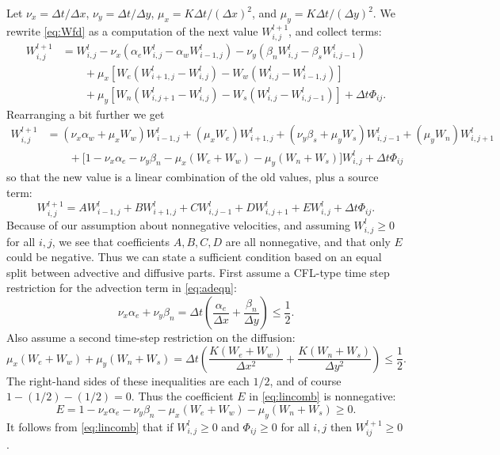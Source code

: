 \documentclass[11pt,final]{amsart}%
\newcommand{\Wlij}{W^l_{i,j}}
\begin{document}
Let $\nu_x = \Delta t/\Delta x$, $\nu_y = \Delta t/\Delta y$, $\mu_x = K \Delta t / (\Delta x)^2$, and $\mu_y = K \Delta t / (\Delta y)^2$.  We rewrite \eqref{eq:Wfd} as a computation of the next value $W_{i,j}^{l+1}$, and collect terms:
\begin{align*}
 W_{i,j}^{l+1} &= \Wlij - \nu_x \left(\alpha_e \Wlij - \alpha_w W_{i-1,j}^l\right) - \nu_y \left(\beta_n \Wlij - \beta_s W_{i,j-1}^l\right)  \\
      &\qquad + \mu_x \left[W_e \left(W_{i+1,j}^l - \Wlij\right) - W_w \left(\Wlij - W_{i-1,j}^l\right)\right]  \\
      &\qquad + \mu_y \left[W_n \left(W_{i,j+1}^l - \Wlij\right) - W_s \left(\Wlij - W_{i,j-1}^l\right)\right] + \Delta t \Phi_{ij}.
\end{align*}
Rearranging a bit further we get
\begin{align*}
 W_{i,j}^{l+1} &= (\nu_x \alpha_w + \mu_x W_w) W_{i-1,j}^l + (\mu_x W_e) W_{i+1,j}^l + (\nu_y \beta_s + \mu_y W_s) W_{i,j-1}^l + (\mu_y W_n) W_{i,j+1}^l \\
      &\qquad + \Big[1 - \nu_x \alpha_e - \nu_y \beta_n - \mu_x (W_e + W_w) - \mu_y (W_n + W_s)\Big] \Wlij + \Delta t \Phi_{ij}
\end{align*}
so that the new value is a linear combination of the old values, plus a source term:
\begin{equation}
W_{i,j}^{l+1} = A W_{i-1,j}^l + B W_{i+1,j}^l + C W_{i,j-1}^l + D W_{i,j+1}^l + E \Wlij + \Delta t \Phi_{ij}. \label{eq:lincomb}
\end{equation}
Because of our assumption about nonnegative velocities, and assuming $\Wlij \ge 0$ for all $i,j$, we see that coefficients $A,B,C,D$ are all nonnegative, and that only $E$ could be negative.  Thus we can state a sufficient condition based on an equal split between advective and diffusive parts.  First assume a CFL-type time step restriction for the advection term in  \eqref{eq:adeqn}:
\begin{equation}
\nu_x \alpha_e + \nu_y \beta_n = \Delta t \left(\frac{\alpha_e}{\Delta x} + \frac{\beta_n}{\Delta y}\right) \le \frac{1}{2}. \label{eq:adstabcond}
\end{equation}
Also assume a second time-step restriction on the diffusion:
\begin{equation}
\mu_x (W_e + W_w) + \mu_y (W_n + W_s) = \Delta t \left(\frac{K(W_e + W_w)}{\Delta x^2} + \frac{K(W_n + W_s)}{\Delta y^2}\right) \le \frac{1}{2}. \label{eq:diffstabcond}
\end{equation}
The right-hand sides of these inequalities are each $1/2$, and of course $1-(1/2)-(1/2)=0$.  Thus the coefficient $E$ in \eqref{eq:lincomb} is nonnegative:
	$$E = 1 - \nu_x \alpha_e - \nu_y \beta_n - \mu_x (W_e + W_w) - \mu_y (W_n + W_s) \ge 0.$$
It follows from \eqref{eq:lincomb} that if $\Wlij\ge 0$ and $\Phi_{ij}\ge 0$ for all $i,j$ then $W_{ij}^{l+1}\ge 0$.
\end{document}
